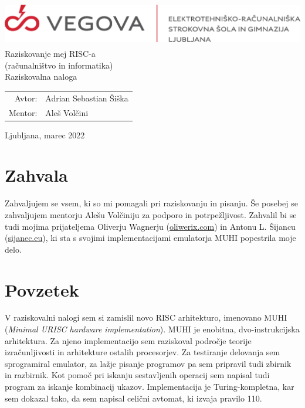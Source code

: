 \documentclass[12pt]{article}
\begin{document}
\linespread{1.25}
\begin{titlepage}
  \begin{center}
    \includegraphics[height=2cm]{slike/vegova.png}\\
    \Huge
    \vspace*{6cm}
    Raziskovanje mej RISC-a\\
    \Large
    (računalništvo in informatika)\\
    Raziskovalna naloga\\
  \end{center}
  \vspace{8cm}
  \begin{tabular}{rl}
    Avtor: & Adrian Sebastian Šiška\\
    Mentor: & Aleš Volčini
  \end{tabular}
  \vspace{1cm}
  \begin{center}
    Ljubljana, marec 2022
  \end{center}
\end{titlepage}

\pagebreak

\tableofcontents

\pagebreak

\listoffigures

\pagebreak

\section{Zahvala}
Zahvaljujem se vsem, ki so mi pomagali pri raziskovanju in pisanju.
Še posebej se zahvaljujem mentorju Alešu Volčiniju za podporo in potrpežljivost.
Zahvalil bi se tudi mojima prijateljema Oliverju Wagnerju (\url{oliwerix.com}) in Antonu L. Šijancu (\url{sijanec.eu}), ki sta s svojimi implementacijami emulatorja MUHI popestrila moje delo.


\pagebreak


\section{Povzetek}
V raziskovalni nalogi sem si zamislil novo RISC arhitekturo, imenovano MUHI (\textit{Minimal URISC hardware implementation}).
MUHI je enobitna, dvo-instrukcijska arhitektura.
Za njeno implementacijo sem raziskoval področje teorije izračunljivosti in arhitekture ostalih procesorjev.
Za testiranje delovanja sem sprogramiral emulator, za lažje pisanje programov pa sem pripravil tudi zbirnik in razbirnik.
Kot pomoč pri iskanju sestavljenih operacij sem napisal tudi program za iskanje kombinacij ukazov.
Implementacija je Turing-kompletna, kar sem dokazal tako, da sem napisal celični avtomat, ki izvaja pravilo 110.
\end{document}
